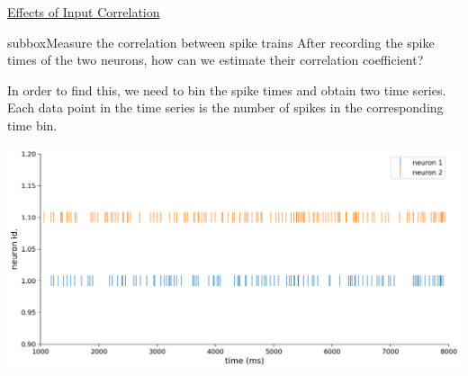 \begin{textbox}{\href{https://compneuro.neuromatch.io/tutorials/W1D4_GeneralizedLinearModels/student/W1D4_Tutorial1.html}{Effects of Input Correlation } }
\begin{subbox}{subbox}{Measure the correlation between spike trains}
After recording the spike times of the two neurons, how can we estimate their correlation coefficient? 

In order to find this, we need to bin the spike times and obtain two time series. Each data point in the time series is the number of spikes in the corresponding time bin.

\begin{center}
    
\includegraphics[scale=0.17]{Figures/BNM/LIF_Figure6.png}
\end{center}

\end{subbox}
\end{textbox}

